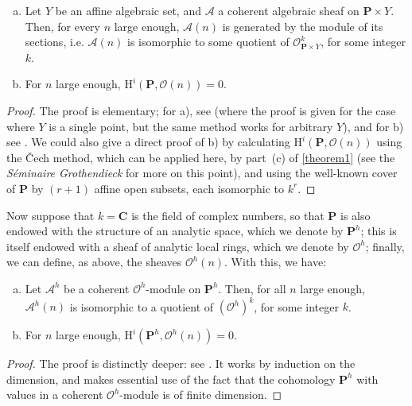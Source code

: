 \documentclass{article}
\theoremstyle{plain}
\newenvironment{theorem}[1]
    {\renewcommand\theinnercustomtheorem{#1}\innercustomtheorem}
    {\endinnercustomtheorem}
\newenvironment{corollary}[1]
    {\renewcommand\theinnercustomcorollary{#1}\innercustomcorollary}
    {\endinnercustomcorollary}
\theoremstyle{definition}
\newcommand{\sh}[1]{{\mathscr{#1}}}
\newcommand{\HH}{\mathrm{H}}
\newcommand{\oldpage}[1]{\marginpar{\footnotesize$\Big\vert$ \textit{p.~#1}}}
\begin{document}
\begin{theorem}{3}
\label{theorem3}
\begin{enumerate}[(a)]
  \item Let $Y$ be an affine algebraic set, and $\sh{A}$ a coherent algebraic sheaf on $\mathbf{P}\times Y$.
    Then, for every $n$ large enough, $\sh{A}(n)$ is generated by the module of its sections, i.e. $\sh{A}(n)$ is isomorphic to some quotient of $\sh{O}_{\mathbf{P}\times Y}^k$, for some integer $k$.
  \item For $n$ large enough, $\HH^i(\mathbf{P},\sh{O}(n))=0$.
\end{enumerate}
\end{theorem}

\begin{proof}
  The proof is elementary; for a), see \cite[page~247, th\'{e}or\`{e}me~1]{1} (where the proof is given for the case where $Y$ is a single point, but the same method works for arbitrary $Y$), and for b) see \cite[page~259, th\'{e}or\`{e}me~2]{1}.
  We could also give a direct proof of b) by calculating $\HH^i(\mathbf{P},\sh{O}(n))$ using the \v{C}ech method, which can be applied here, by part~(c) of \cref{theorem1} (see the \emph{S\'{e}minaire Grothendieck} for more on this point), and using the well-known cover of $\mathbf{P}$ by $(r+1)$ affine open subsets, each isomorphic to $k^r$.
\end{proof}

Now suppose that $k=\mathbf{C}$ is the field of complex numbers, so that $\mathbf{P}$ is also endowed with the structure of an analytic space, which we denote by $\mathbf{P}^h$;
this is itself endowed with a sheaf of analytic local rings, which we denote by $\sh{O}^h$;
finally, we can define, as above, the sheaves $\sh{O}^h(n)$.
With this, we have:

\begin{corollary}{\!\!}
\label{corollary-3}
  \oldpage{2-07}
  \begin{enumerate}[(a)]
    \item Let $\sh{A}^h$ be a coherent $\sh{O}^h$-module on $\mathbf{P}^h$.
      Then, for all $n$ large enough, $\sh{A}^h(n)$ is isomorphic to a quotient of $(\sh{O}^h)^k$, for some integer $k$.
    \item For $n$ large enough, $\HH^i(\mathbf{P}^h,\sh{O}^h(n))=0$.
  \end{enumerate}
\end{corollary}

\begin{proof}
  The proof is distinctly deeper: see \cite[lemme~5, page~12, and lemma~8, page~24]{2}.
  It works by induction on the dimension, and makes essential use of the fact that the cohomology $\mathbf{P}^h$ with values in a coherent $\sh{O}^h$-module is of finite dimension.
\end{proof}
\end{document}
